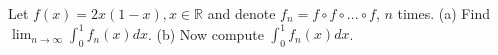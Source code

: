 Let $f(x)=2x(1-x), x\in\mathbb{R}$ and denote $f_n=f\circ f\circ ... \circ f$, $n$ times.
(a) Find $\lim_{n\rightarrow\infty} \int^1_0 f_n(x)dx$.
(b) Now compute $\int^1_0 f_n(x)dx$.